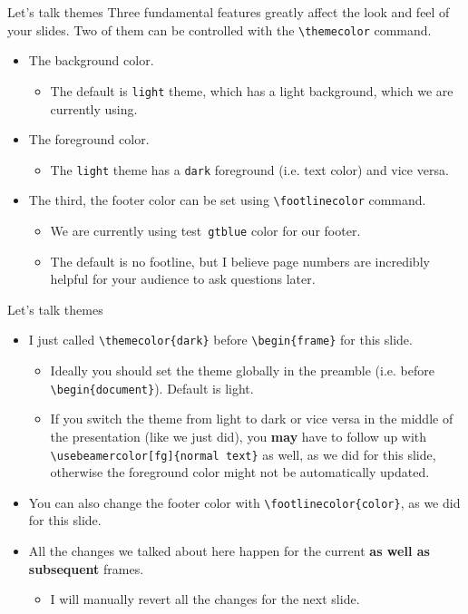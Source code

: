 \documentclass{beamer}
\newcommand{\testcolor}[1]{\colorbox{#1}{\textcolor{#1}{test}}~\texttt{#1}}
\begin{document}
\begin{frame}[fragile]{Let's talk themes}
Three fundamental features greatly affect the look and feel of your slides. Two of them can be controlled with the \verb|\themecolor| command.
\begin{itemize}
\item The background color.
\begin{itemize}
    \item The default is \verb|light| theme, which has a light background, which we are currently using.
\end{itemize}
\item The foreground color.
\begin{itemize}
    \item The \verb|light| theme has a \verb|dark| foreground (i.e. text color) and vice versa.
\end{itemize}
\item The third, the footer color can be set using \verb|\footlinecolor| command.
\begin{itemize}
    \item We are currently using \testcolor{gtblue} color for our footer.
    \item The default is no footline, but I believe page numbers are incredibly helpful for your audience to ask questions later.
\end{itemize}
\end{itemize}
\end{frame}

\begin{frame}[fragile]{Let's talk themes}
\begin{itemize}
\item I just called \verb|\themecolor{dark}| before \verb|\begin{frame}| for this slide.
\begin{itemize}
    \item Ideally you should set the theme globally in the preamble (i.e. before \verb|\begin{document}|). Default is light.
    \item If you switch the theme from light to dark or vice versa in the middle of the presentation (like we just did), you \textbf{may} have to follow up with \verb|\usebeamercolor[fg]{normal text}| as well, as we did for this slide, otherwise the foreground color might not be automatically updated.
\end{itemize}
\item You can also change the footer color with \verb|\footlinecolor{color}|, as we did for this slide.
\item All the changes we talked about here happen for the current \textbf{as well as subsequent} frames.
\begin{itemize}
    \item I will manually revert all the changes for the next slide.
\end{itemize}
\end{itemize}
\end{frame}
\end{document}
